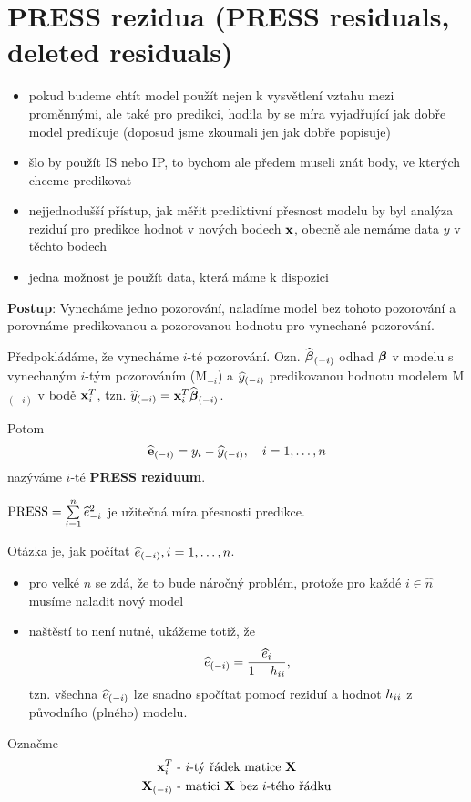 \section{PRESS rezidua (PRESS residuals, deleted residuals)}
\begin{itemize}
	\item pokud budeme chtít model použít nejen k vysvětlení vztahu mezi proměnnými, ale také pro predikci, hodila by se míra vyjadřující jak dobře model predikuje (doposud jsme zkoumali jen jak dobře popisuje)
	\item šlo by použít IS nebo IP, to bychom ale předem museli znát body, ve kterých chceme predikovat
	\item nejjednodušší přístup, jak měřit prediktivní přesnost modelu by byl analýza reziduí pro predikce hodnot v nových bodech $\textbf{x}$, obecně ale nemáme data $y$ v těchto bodech
	\item jedna možnost je použít data, která máme k dispozici
\end{itemize}

\textbf{Postup}: Vynecháme jedno pozorování, naladíme model bez tohoto pozorování a porovnáme predikovanou a pozorovanou hodnotu pro vynechané pozorování.

Předpokládáme, že vynecháme $i$-té pozorování. Ozn. $\widehat{\boldsymbol{\beta}}_{(-i)}$ odhad $\boldsymbol{\beta}$ v modelu s vynechaným $i$-tým pozorováním (M$_{-i}$) a $\widehat{y}_{(-i)}$ predikovanou hodnotu modelem M$_{(-i)}$ v bodě $\textbf{x}_i^T$, tzn. $\widehat{y}_{(-i)} = \textbf{x}_i^T \widehat{\boldsymbol{\beta}}_{(-i)}$.

Potom
$$
\widehat{\textbf{e}}_{(-i)} = y_i - \widehat{y}_{(-i)}, \quad i = 1, \dots, n
$$
nazýváme $i$-té \textbf{PRESS reziduum}.

$\mathrm{PRESS} = \sum\limits_{i=1}^{n} \widehat{e}_{-i}^2$ je užitečná míra přesnosti predikce.

\begin{remark}
	Otázka je, jak počítat $\widehat{e}_{(-i)}, i = 1, \dots, n$.
	\begin{itemize}
		\item pro velké $n$ se zdá, že to bude náročný problém, protože pro každé $i \in \hat{n}$ musíme naladit nový model
		\item naštěstí to není nutné, ukážeme totiž, že
		$$
		\widehat{e}_{(-i)} = \frac{\widehat{e}_i}{1 - h_{ii}},
		$$
		tzn. všechna $\widehat{e}_{(-i)}$ lze snadno spočítat pomocí reziduí a hodnot $h_{ii}$ z původního (plného) modelu.
	\end{itemize}
\end{remark}

Označme
\begin{align*}
	\textbf{x}_i^T & \text{ - $i$-tý řádek matice } \textbf{X} \\
	\textbf{X}_{(-i)} & \text{ - matici $\textbf{X}$ bez $i$-tého řádku}
\end{align*}

